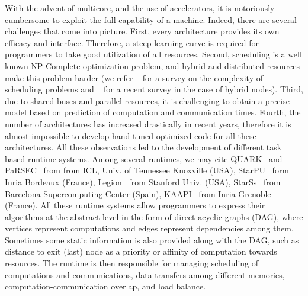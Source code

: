 \documentclass[runningheads]{llncs} %
\begin{document}
With the advent of multicore, and the use of accelerators, it is notoriously cumbersome to exploit the full capability of a machine. Indeed, there are several challenges that come into picture. First, every architecture provides its own efficacy and interface. Therefore, a steep learning curve is required for programmers to take good utilization of all resources. Second, scheduling is a well known NP-Complete optimization problem, and hybrid and distributed resources make this problem harder (we refer ~\cite{webpagescheduling} for a survey on the complexity of scheduling problems and ~\cite{bleuse2015scheduling} for a recent survey in the case of hybrid nodes). Third, due to shared buses and parallel resources, it is challenging to obtain a precise model based on prediction of computation and communication times. Fourth, the number of architectures has increased drastically in recent years, therefore it is almost impossible to develop hand tuned optimized code for all these architectures. All these observations led to the development of different task based runtime systems. Among several runtimes, we may cite QUARK~\cite{YarKhan:2011:Quark:Manual} and PaRSEC~\cite{parsec} from from ICL, Univ. of Tennessee Knoxville (USA), StarPU~\cite{starpu} form Inria Bordeaux (France), Legion~\cite{legion12} from Stanford Univ. (USA), StarSs~\cite{ompss} from Barcelona Supercomputing Center (Spain), KAAPI~\cite{kaapi} from Inria Grenoble (France). All these runtime systems allow programmers to express their algorithms at the abstract level in the form of direct acyclic graphs (DAG), where vertices represent computations and edges represent dependencies among them. Sometimes some static information is also provided along with the DAG, such as distance to exit (last) node as a priority or affinity of computation towards resources. The runtime is then responsible for managing scheduling of computations and communications, data transfers among different memories, computation-communication overlap, and load balance.


\end{document}
